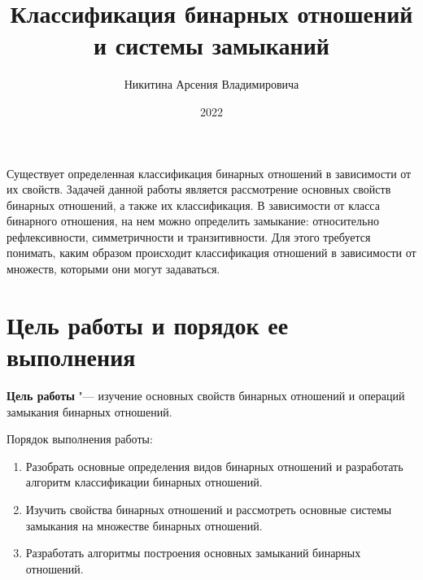 \documentclass[bachelor, och, labwork]{shiza}
\begin{document}

\title{Классификация бинарных отношений и системы замыканий}





\author{Никитина Арсения Владимировича}



\date{2022}

\maketitle


\tableofcontents

\intro

Существует определенная классификация бинарных отношений в зависимости от их 
свойств. Задачей данной работы является рассмотрение основных свойств бинарных 
отношений, а также их классификация. В зависимости от класса бинарного 
отношения, на нем можно определить замыкание: относительно рефлексивности,
симметричности и транзитивности. Для этого требуется понимать, каким образом 
происходит классификация отношений в зависимости от множеств, которыми они могут
задаваться.

\section{\textbf{Цель работы и порядок ее выполнения}}

\textbf{Цель работы} "--- изучение основных свойств бинарных отношений и 
операций замыкания бинарных отношений.

Порядок выполнения работы:

\begin{enumerate}

    \item Разобрать основные определения видов бинарных отношений и разработать
    алгоритм классификации бинарных отношений.

    \item Изучить свойства бинарных отношений и рассмотреть основные системы
    замыкания на множестве бинарных отношений.

    \item Разработать алгоритмы построения основных замыканий бинарных отношений.

\end{enumerate}
\end{document}
